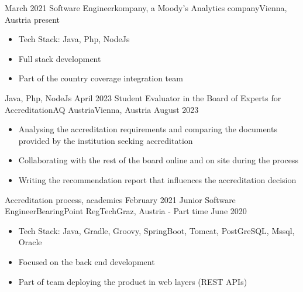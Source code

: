 %
%
%
\begin{experiences}
\experience
    {March 2021}   {Software Engineer}{kompany, a Moody's Analytics company}{Vienna, Austria}  
    {present} {
                      \begin{itemize}
                        \item Tech Stack: Java, Php, NodeJs               
                        \item Full stack development
                        \item Part of the country coverage integration team
                        
                      \end{itemize}
                    }
                    {Java, Php, NodeJs}
  \emptySeparator
  \experience
    {April 2023} { Student Evaluator in the Board of Experts for Accreditation}{AQ Austria}{Vienna, Austria}
    {August 2023}    {
                      \begin{itemize}
                        \item Analysing the accreditation requirements and comparing the documents \\ provided by the institution seeking accreditation              
                        \item Collaborating with the rest of the board online and on site during the process              
                        \item Writing the recommendation report that influences the accreditation decision
                      \end{itemize}
                    }
                    {Accreditation process, academics}
\emptySeparator
 \experience
    {February 2021}   {Junior Software Engineer}{BearingPoint RegTech}{Graz, Austria - Part time}
    {June 2020} {
                      \begin{itemize}
                        \item Tech Stack: Java, Gradle, Groovy, SpringBoot, Tomcat, PostGreSQL, Mssql, Oracle                  
                        \item Focused on the back end development
                        \item Part of team deploying the product in web layers (REST APIs)
                        

\end{itemize}}
\end{experiences}
